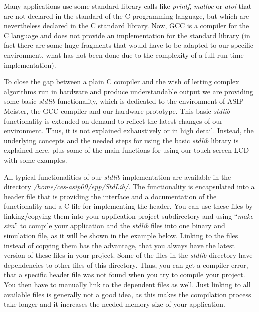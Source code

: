 Many applications use some standard library calls like \emph{printf},
\emph{malloc} or \emph{atoi} that are not declared in the standard of
the C programming language, but which are nevertheless declared in the C
standard library. Now, GCC is a compiler for the C language and does not
provide an implementation for the standard library (in fact there are
some huge fragments that would have to be adapted to our specific
environment, what has not been done due to the complexity of a full
run-time implementation).

To close the gap between a plain C compiler and the wish of letting
complex algorithms run in hardware and produce understandable output we
are providing some basic \emph{stdlib} functionality, which is dedicated
to the environment of ASIP Meister, the GCC compiler and our hardware
prototype. This basic \emph{stdlib} functionality is extended on demand
to reflect the latest changes of our environment. Thus, it is not
explained exhaustively or in high detail. Instead, the underlying
concepts and the needed steps for using the basic \emph{stdlib} library
is explained here, plus some of the main functions for using our touch
screen LCD with some examples.

All typical functionalities of our \emph{stdlib} implementation are
available in the directory \emph{/home/ces-asip00/epp/StdLib/.} The
functionality is encapsulated into a header file that is providing the
interface and a documentation of the functionality and a C file for
implementing the header. You can use these files by linking/copying them
into your application project subdirectory and using ``\emph{make sim}''
to compile your application and the \emph{stdlib} files into one binary
and simulation file, as it will be shown in the example below. Linking
to the files instead of copying them has the advantage, that you always
have the latest version of these files in your project. Some of the
files in the \emph{stdlib} directory have dependencies to other files of
this directory. Thus, you can get a compiler error, that a specific
header file was not found when you try to compile your project. You then
have to manually link to the dependent files as well. Just linking to
all available files is generally not a good idea, as this makes the
compilation process take longer and it increases the needed memory size
of your application.

